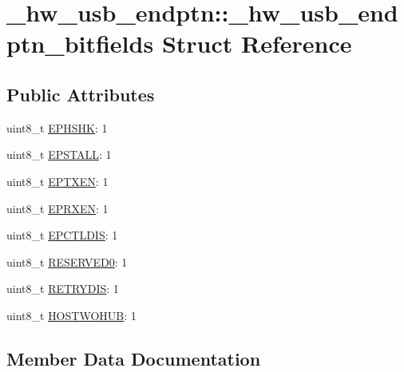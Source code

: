 \hypertarget{struct__hw__usb__endptn_1_1__hw__usb__endptn__bitfields}{}\section{\+\_\+hw\+\_\+usb\+\_\+endptn\+:\+:\+\_\+hw\+\_\+usb\+\_\+endptn\+\_\+bitfields Struct Reference}
\label{struct__hw__usb__endptn_1_1__hw__usb__endptn__bitfields}
\subsection*{Public Attributes}
\begin{DoxyCompactItemize}
\item 
uint8\+\_\+t \hyperlink{struct__hw__usb__endptn_1_1__hw__usb__endptn__bitfields_ab2862ba8a91453a7814563048d334b9a}{E\+P\+H\+S\+HK}\+: 1
\item 
uint8\+\_\+t \hyperlink{struct__hw__usb__endptn_1_1__hw__usb__endptn__bitfields_ae21cf394421f96f73a928da048a024f5}{E\+P\+S\+T\+A\+LL}\+: 1
\item 
uint8\+\_\+t \hyperlink{struct__hw__usb__endptn_1_1__hw__usb__endptn__bitfields_a83a734fec12502156b1268b2b693ce55}{E\+P\+T\+X\+EN}\+: 1
\item 
uint8\+\_\+t \hyperlink{struct__hw__usb__endptn_1_1__hw__usb__endptn__bitfields_a3602914f32910968e9087eeb02ad9767}{E\+P\+R\+X\+EN}\+: 1
\item 
uint8\+\_\+t \hyperlink{struct__hw__usb__endptn_1_1__hw__usb__endptn__bitfields_a0ab4c6568f9057e96ba1cf7710f3e4de}{E\+P\+C\+T\+L\+D\+IS}\+: 1
\item 
uint8\+\_\+t \hyperlink{struct__hw__usb__endptn_1_1__hw__usb__endptn__bitfields_a7ec6e4f6bf0f993f7bd35c3db908f014}{R\+E\+S\+E\+R\+V\+E\+D0}\+: 1
\item 
uint8\+\_\+t \hyperlink{struct__hw__usb__endptn_1_1__hw__usb__endptn__bitfields_a6903ff34a06f3bd6b964d9f814d55dc6}{R\+E\+T\+R\+Y\+D\+IS}\+: 1
\item 
uint8\+\_\+t \hyperlink{struct__hw__usb__endptn_1_1__hw__usb__endptn__bitfields_ad8cff26252e161ff550d3c200e710ac3}{H\+O\+S\+T\+W\+O\+H\+UB}\+: 1
\end{DoxyCompactItemize}


\subsection{Member Data Documentation}
